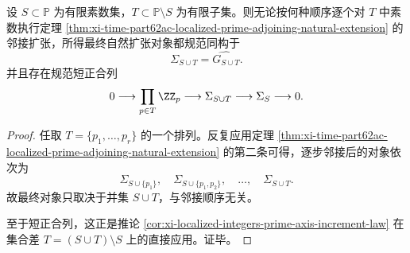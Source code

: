 \begin{corollary}[逐素数邻接的顺序无关性与缺失素方向的精确核]\label{cor:xi-time-part62ac-prime-adjoining-order-independent-kernel-product}
设 \(S\subset\mathbb P\) 为有限素数集，\(T\subset\mathbb P\setminus S\) 为有限子集。则无论按何种顺序逐个对 \(T\) 中素数执行定理 \ref{thm:xi-time-part62ac-localized-prime-adjoining-natural-extension} 的邻接扩张，所得最终自然扩张对象都规范同构于
\[
\Sigma_{S\cup T}=\widehat{G_{S\cup T}}.
\]
并且存在规范短正合列
\[
0\longrightarrow \prod_{p\in T}\ZZ_p
\longrightarrow
\Sigma_{S\cup T}
\longrightarrow
\Sigma_S
\longrightarrow 0.
\]
\end{corollary}
\begin{proof}
任取 \(T=\{p_1,\dots,p_r\}\) 的一个排列。反复应用定理 \ref{thm:xi-time-part62ac-localized-prime-adjoining-natural-extension} 的第二条可得，逐步邻接后的对象依次为
\[
\Sigma_{S\cup\{p_1\}},
\quad
\Sigma_{S\cup\{p_1,p_2\}},
\quad
\dots,
\quad
\Sigma_{S\cup T}.
\]
故最终对象只取决于并集 \(S\cup T\)，与邻接顺序无关。

至于短正合列，这正是推论 \ref{cor:xi-localized-integers-prime-axis-increment-law} 在集合差 \(T=(S\cup T)\setminus S\) 上的直接应用。证毕。
\end{proof}

\endinput

